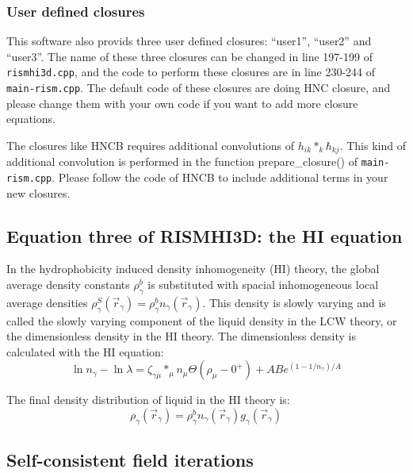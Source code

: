 \documentclass[aip,amsmath,amssymb,reprint,onecolumn]{revtex4-1}
\begin{document}
\subsubsection{User defined closures}

{\it

This software also provids three user defined closures: ``user1'', ``user2'' and ``user3''. The name of these three closures can be changed in line 197-199 of \texttt{rismhi3d.cpp}, and the code to perform these closures are in line 230-244 of \texttt{main-rism.cpp}. The default code of these closures are doing HNC closure, and please change them with your own code if you want to add more closure equations.

The closures like HNCB requires additional convolutions of $h_{ik}*_k\hbar_{kj}$. This kind of additional convolution is performed in the function prepare\_closure() of \texttt{main-rism.cpp}. Please follow the code of HNCB to include additional terms in your new closures.

}

\subsection{Equation three of RISMHI3D: the HI equation}

In the hydrophobicity induced density inhomogeneity (HI) theory, the global average density constants $\rho^b_\gamma$ is substituted with spacial inhomogeneous local average densities $\rho^S_\gamma(\vec{r}_\gamma) = \rho^b_\gamma n_\gamma(\vec{r}_\gamma)$. This density is slowly varying and is called the slowly varying component of the liquid density in the LCW theory, or the dimensionless density in the HI theory. The dimensionless density is calculated with the HI equation:
\begin{equation}
    \ln n_\gamma - \ln\lambda = \zeta_{\gamma\mu}*_\mu n_\mu\Theta(\rho_\mu-0^+) + ABe^{(1-1/n_\gamma)/A}
\end{equation}

The final density distribution of liquid in the HI theory is:
\begin{equation}
    \rho_\gamma(\vec{r}_\gamma) = \rho^b_\gamma n_\gamma(\vec{r}_\gamma) g_\gamma(\vec{r}_\gamma)
\end{equation}

\subsection{Self-consistent field iterations}
\end{document}
